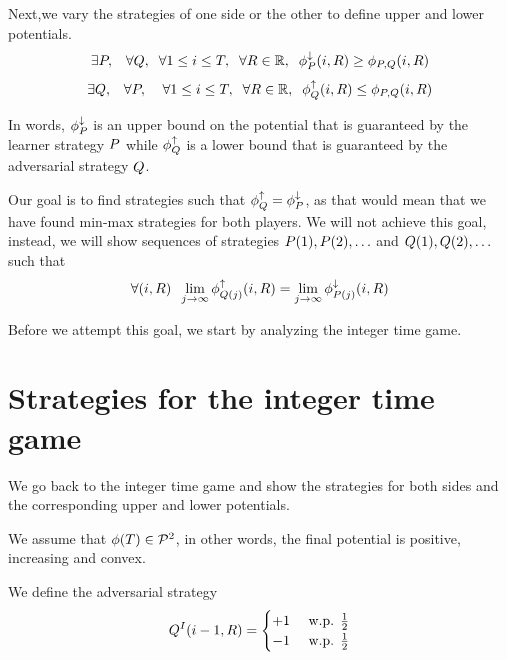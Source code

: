 \documentclass{article}[12pt]
\begin{document}
Next,we vary the strategies of one side or the other to define upper
and lower potentials.
\begin{equation} \label{eqn:upperPotentials}
  \exists P, \;\;\; \forall Q,\;\; \forall 1\leq i \leq
  T,\;\; \forall R \in \mathbb{R},\;\; \phi_{P}^{\downarrow}(i,R) \geq \phi_{P,Q}(i,R)
\end{equation}
\begin{equation} \label{eqn:lowerPotentials}
  \exists Q, \;\;\; \forall P, \;\; \;\; \forall 1\leq i \leq
  T,\;\; \forall R \in \mathbb{R},\;\; \phi_{Q}^{\uparrow}(i,R) \leq \phi_{P,Q}(i,R)
\end{equation}

In words, $\phi_{P}^{\downarrow}$ is an upper bound on the potential that is 
guaranteed by the learner strategy $P$ while $\phi_{Q}^{\uparrow}$
is a lower bound that is guaranteed by the adversarial
strategy $Q$.

Our goal is to find strategies such that $\phi_{Q}^{\uparrow} = \phi_{P}^{\downarrow}$, as
that would mean that we have found min-max strategies for both
players. We will not achieve this goal, instead, we will show
sequences of strategies $P(1),P(2),\ldots$ and
$Q(1),Q(2),\ldots$ such that
\begin{equation} \label{eqn:limitPotential}
\forall (i,R)\;\;\lim_{j \to \infty}\phi_{Q(j)}^{\uparrow}(i,R) = \lim_{j \to
  \infty} \phi_{P(j)}^{\downarrow}(i,R)
\end{equation}

Before we attempt this goal, we start by analyzing the integer time game. 


\section{Strategies for the integer time  game} \label{sec:strat-integer}

We go back to the integer time game and show the strategies for both
sides and the corresponding upper and lower potentials.

We assume that $\phi(T)  \in {\cal P}^{2}$, in other words, the final
potential is positive, increasing and convex.

We define the adversarial strategy
\begin{equation} \label{eqn:adv-strat-p}
  Q^I(i-1,R) =
  \begin{cases}
    +1 & \mbox{ w.p. } \frac{1}{2}\\
    -1 & \mbox{ w.p. } \frac{1}{2}\\
  \end{cases}
\end{equation}
\end{document}
